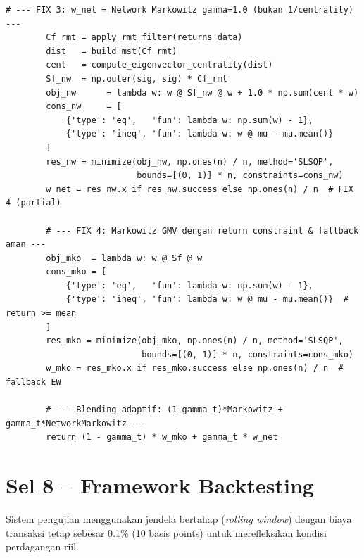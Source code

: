 \documentclass[12pt,a4paper]{article}
\begin{document}
\begin{lstlisting}[caption={Kelas-kelas strategi portofolio (AGGP v2 -- 4 Fixes Applied)}]
        # --- FIX 3: w_net = Network Markowitz gamma=1.0 (bukan 1/centrality) ---
        Cf_rmt = apply_rmt_filter(returns_data)
        dist   = build_mst(Cf_rmt)
        cent   = compute_eigenvector_centrality(dist)
        Sf_nw  = np.outer(sig, sig) * Cf_rmt
        obj_nw      = lambda w: w @ Sf_nw @ w + 1.0 * np.sum(cent * w)
        cons_nw     = [
            {'type': 'eq',   'fun': lambda w: np.sum(w) - 1},
            {'type': 'ineq', 'fun': lambda w: w @ mu - mu.mean()}
        ]
        res_nw = minimize(obj_nw, np.ones(n) / n, method='SLSQP',
                          bounds=[(0, 1)] * n, constraints=cons_nw)
        w_net = res_nw.x if res_nw.success else np.ones(n) / n  # FIX 4 (partial)

        # --- FIX 4: Markowitz GMV dengan return constraint & fallback aman ---
        obj_mko  = lambda w: w @ Sf @ w
        cons_mko = [
            {'type': 'eq',   'fun': lambda w: np.sum(w) - 1},
            {'type': 'ineq', 'fun': lambda w: w @ mu - mu.mean()}  # return >= mean
        ]
        res_mko = minimize(obj_mko, np.ones(n) / n, method='SLSQP',
                           bounds=[(0, 1)] * n, constraints=cons_mko)
        w_mko = res_mko.x if res_mko.success else np.ones(n) / n  # fallback EW

        # --- Blending adaptif: (1-gamma_t)*Markowitz + gamma_t*NetworkMarkowitz ---
        return (1 - gamma_t) * w_mko + gamma_t * w_net
\end{lstlisting}

\section{Sel 8 -- Framework Backtesting}
Sistem pengujian menggunakan jendela bertahap (\textit{rolling window}) dengan biaya transaksi tetap sebesar 0.1\% (10 basis points) untuk merefleksikan kondisi perdagangan riil.
\end{document}

